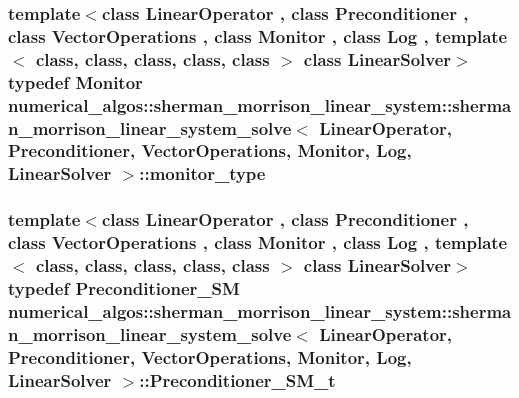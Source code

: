 \hypertarget{classnumerical__algos_1_1sherman__morrison__linear__system_1_1sherman__morrison__linear__system__solve_aa758c9aa0de7521078408103a5f9825d}{
\subsubsection[{monitor\-\_\-type}]{\setlength{\rightskip}{0pt plus 5cm}template$<$class Linear\-Operator , class Preconditioner , class Vector\-Operations , class Monitor , class Log , template$<$ class, class, class, class, class $>$ class Linear\-Solver$>$ typedef Monitor {\bf numerical\-\_\-algos\-::sherman\-\_\-morrison\-\_\-linear\-\_\-system\-::sherman\-\_\-morrison\-\_\-linear\-\_\-system\-\_\-solve}$<$ Linear\-Operator, Preconditioner, Vector\-Operations, Monitor, Log, Linear\-Solver $>$\-::{\bf monitor\-\_\-type}}}\label{classnumerical__algos_1_1sherman__morrison__linear__system_1_1sherman__morrison__linear__system__solve_aa758c9aa0de7521078408103a5f9825d}
\hypertarget{classnumerical__algos_1_1sherman__morrison__linear__system_1_1sherman__morrison__linear__system__solve_a93a7b771196ea179d7c5cfc6e4f55ca4}{
\subsubsection[{Preconditioner\-\_\-\-S\-M\-\_\-t}]{\setlength{\rightskip}{0pt plus 5cm}template$<$class Linear\-Operator , class Preconditioner , class Vector\-Operations , class Monitor , class Log , template$<$ class, class, class, class, class $>$ class Linear\-Solver$>$ typedef Preconditioner\-\_\-\-S\-M {\bf numerical\-\_\-algos\-::sherman\-\_\-morrison\-\_\-linear\-\_\-system\-::sherman\-\_\-morrison\-\_\-linear\-\_\-system\-\_\-solve}$<$ Linear\-Operator, Preconditioner, Vector\-Operations, Monitor, Log, Linear\-Solver $>$\-::{\bf Preconditioner\-\_\-\-S\-M\-\_\-t}}}\label{classnumerical__algos_1_1sherman__morrison__linear__system_1_1sherman__morrison__linear__system__solve_a93a7b771196ea179d7c5cfc6e4f55ca4}
